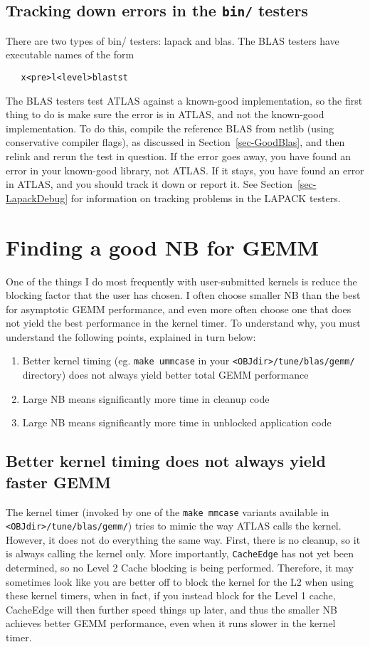 \documentclass[11pt]{article}
\begin{document}
\subsection{Tracking down errors in the {\tt bin/} testers}
There are two types of bin/ testers: lapack and blas.  The BLAS testers
have executable names of the form 
\begin{verbatim}
   x<pre>l<level>blastst
\end{verbatim}
The BLAS testers test ATLAS against a known-good implementation, so the first
thing to do is make sure the error is in ATLAS, and not the known-good
implementation.  To do this, compile the reference BLAS from netlib (using
conservative compiler flags), as 
discussed in Section~\ref{sec-GoodBlas}, and then relink and rerun the
test in question.  If the error goes away, you have found an error in your
known-good library, not ATLAS.  If it stays, you have found an error in
ATLAS, and you should track it down or report it.
See Section~\ref{sec-LapackDebug} for information on tracking problems in the
LAPACK testers.

\section{Finding a good NB for GEMM}
One of the things I do most frequently with user-submitted kernels is reduce
the blocking factor that the user has chosen.  I often choose smaller NB
than the best for asymptotic GEMM performance, and even more often choose
one that does not yield the best performance in the kernel timer.
To understand why, you must understand the following points, explained in
turn below:
\begin{enumerate}
\item Better kernel timing (eg. {\tt make ummcase} in your 
{\tt <OBJdir>/tune/blas/gemm/} directory) does not always yield better
total GEMM performance
\item Large NB means significantly more time in cleanup code
\item Large NB means significantly more time in unblocked application code
\end{enumerate}
\subsection{Better kernel timing does not always yield faster GEMM}
The kernel timer (invoked by one of the {\tt make mmcase} variants
available in {\tt <OBJdir>/tune/blas/gemm/}) tries to mimic the way
ATLAS calls the kernel.  However, it does not do everything the same way.
First, there is no cleanup, so it is always calling the kernel only.  More
importantly, {\tt CacheEdge} has not yet been determined, so no
Level 2 Cache blocking is being performed.  Therefore, it may sometimes
look like you are better off to block the kernel for the L2 when using
these kernel timers, when in fact, if you instead block for the Level 1 cache,
CacheEdge will then further speed things up later, and thus the smaller
NB achieves better GEMM performance, even when it runs slower in the kernel
timer.  
\end{document}
